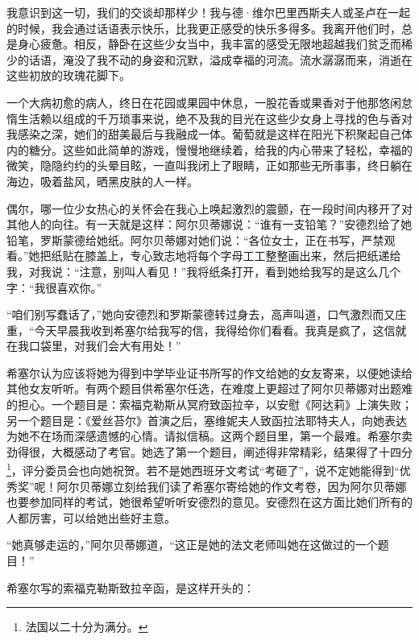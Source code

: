 \par 我意识到这一切，我们的交谈却那样少！我与德·维尔巴里西斯夫人或圣卢在一起的时候，我会通过话语表示快乐，比我更正感受的快乐多得多。我离开他们时，总是身心疲惫。相反，静卧在这些少女当中，我丰富的感受无限地超越我们贫乏而稀少的话语，淹没了我不动的身姿和沉默，溢成幸福的河流。流水潺潺而来，消逝在这些初放的玫瑰花脚下。
\par 一个大病初愈的病人，终日在花园或果园中休息，一股花香或果香对于他那悠闲怠惰生活赖以组成的千万琐事来说，绝不及我的目光在这些少女身上寻找的色与香对我感染之深，她们的甜美最后与我融成一体。葡萄就是这样在阳光下积聚起自己体内的糖分。这些如此简单的游戏，慢慢地继续着，给我的内心带来了轻松，幸福的微笑，隐隐约约的头晕目眩，一直叫我闭上了眼睛，正如那些无所事事，终日躺在海边，吸着盐风，晒黑皮肤的人一样。
\par 偶尔，哪一位少女热心的关怀会在我心上唤起激烈的震颤，在一段时间内移开了对其他人的向往。有一天就是这样：阿尔贝蒂娜说：“谁有一支铅笔？”安德烈给了她铅笔，罗斯蒙德给她纸。阿尔贝蒂娜对她们说：“各位女士，正在书写，严禁观看。”她把纸贴在膝盖上，专心致志地将每个字母工工整整画出来，然后把纸递给我，对我说：“注意，别叫人看见！”我将纸条打开，看到她给我写的是这么几个字：“我很喜欢你。”
\par “咱们别写蠢话了，”她向安德烈和罗斯蒙德转过身去，高声叫道，口气激烈而又庄重，“今天早晨我收到希塞尔给我写的信，我得给你们看看。我真是疯了，这信就在我口袋里，对我们会大有用处！”
\par 希塞尔认为应该将她为得到中学毕业证书所写的作文给她的女友寄来，以便她读给其他女友听听。有两个题目供希塞尔任选，在难度上更超过了阿尔贝蒂娜对出题难的担心。一个题目是：索福克勒斯从冥府致函拉辛，以安慰《阿达莉》上演失败；另一个题目是：《爱丝苔尔》首演之后，塞维妮夫人致函拉法耶特夫人，向她表达为她不在场而深感遗憾的心情。请拟信稿。这两个题目里，第一个最难。希塞尔卖劲得很，大概感动了考官。她选了第一个题目，阐述得非常精彩，结果得了十四分\footnote{法国以二十分为满分。}，评分委员会也向她祝贺。若不是她西班牙文考试“考砸了”，说不定她能得到“优秀奖”呢！阿尔贝蒂娜立刻给我们读了希塞尔寄给她的作文考卷，因为阿尔贝蒂娜也要参加同样的考试，她很希望听听安德烈的意见。安德烈在这方面比她们所有的人都厉害，可以给她出些好主意。
\par “她真够走运的，”阿尔贝蒂娜道，“这正是她的法文老师叫她在这做过的一个题目！”
\par 希塞尔写的索福克勒斯致拉辛函，是这样开头的：
